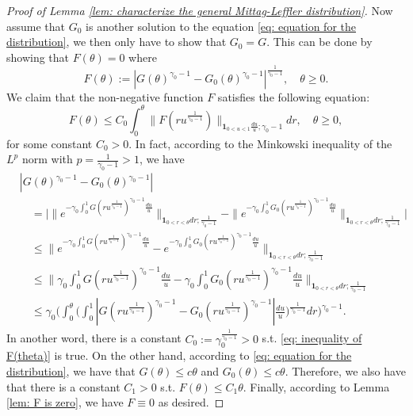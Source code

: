 \documentclass[12pt, a4paper]{amsart}
\theoremstyle{definition}
\numberwithin{equation}{section}
\begin{document}
\begin{proof}[Proof of Lemma \ref{lem: characterize the general Mittag-Leffler distribution}]
	Now assume that $G_0$ is another solution to the equation \eqref{eq: equation for the distribution}, we then only have to show that $G_0 = G$.
	This can be done by showing that $F(\theta) = 0$ where
\[
		F(\theta) := |G(\theta)^{\gamma_0 - 1} - G_0(\theta)^{\gamma_0 - 1}|^{\frac{1}{\gamma_0 - 1}},
		\quad \theta \geq 0.
\]
	We claim that the non-negative function $F$ satisfies the following equation:
\[\label{eq: inequality of F(theta)}
	F(\theta)
	\leq C_0 \int_0^\theta \|  F(ru^{\frac{1}{\gamma_0 - 1}})\|_{\mathbf 1_{0<u<1}\frac{du}{u}; \gamma_0 - 1} dr, \quad \theta \geq 0,
\]
	for some constant $C_0 > 0$.
	In fact, according to the Minkowski inequality of the $L^p$ norm with $p = \frac{1}{\gamma_0 - 1} > 1$, we have
\[\begin{split}
	&|G(\theta)^{\gamma_0 - 1} - G_0(\theta)^{\gamma_0 - 1}|
	\\&\quad = \Big| \|e^{-\gamma_0\int_0^1 G(ru^{\frac{1}{\gamma_0 - 1}})^{\gamma_0 - 1} \frac{du}{u}} \|_{\mathbf 1_{0<r<\theta}dr;\frac{1}{\gamma_0 - 1}} - \|e^{-\gamma_0\int_0^1 G_0(ru^{\frac{1}{\gamma_0 - 1}})^{\gamma_0 - 1} \frac{du}{u}} \|_{\mathbf 1_{0<r<\theta}dr;\frac{1}{\gamma_0 - 1}} \Big| 
	\\ & \quad \leq \| e^{-\gamma_0\int_0^1 G(ru^{\frac{1}{\gamma_0 - 1}})^{\gamma_0 - 1} \frac{du}{u}} - e^{-\gamma_0\int_0^1 G_0(ru^{\frac{1}{\gamma_0 - 1}})^{\gamma_0 - 1} \frac{du}{u}} \|_{\mathbf 1_{0<r<\theta}dr;\frac{1}{\gamma_0 - 1}}
	\\ & \quad \leq \Big\| \gamma_0\int_0^1 G(ru^{\frac{1}{\gamma_0 - 1}})^{\gamma_0 - 1} \frac{du}{u} - \gamma_0\int_0^1 G_0(ru^{\frac{1}{\gamma_0 - 1}})^{\gamma_0 - 1} \frac{du}{u} \Big\|_{\mathbf 1_{0<r<\theta}dr;\frac{1}{\gamma_0 - 1}}
	\\ & \quad \leq \gamma_0 \Big( \int_0^\theta \Big( \int_0^1 |G(ru^{\frac{1}{\gamma_0 - 1}})^{\gamma_0 - 1} - G_0(ru^{\frac{1}{\gamma_0 - 1}})^{\gamma_0 - 1}| \frac{du}{u} \Big)^{\frac{1}{\gamma_0 - 1}} dr \Big)^{\gamma_0 - 1}.
\end{split}\]
	In another word, there is a constant $C_0:= \gamma_0^{\frac{1}{\gamma_0 - 1}}>0$ s.t. \eqref{eq: inequality of F(theta)} is true.
	On the other hand, according to \eqref{eq: equation for the distribution}, we have that $G(\theta) \leq c\theta$ and $G_0(\theta) \leq c \theta$.
	Therefore, we also have that there is a constant $C_1 > 0$ s.t. $F(\theta) \leq C_1 \theta$.
	Finally, according to Lemma \ref{lem: F is zero}, we have $F \equiv 0$ as desired.
\end{proof}
\end{document}
